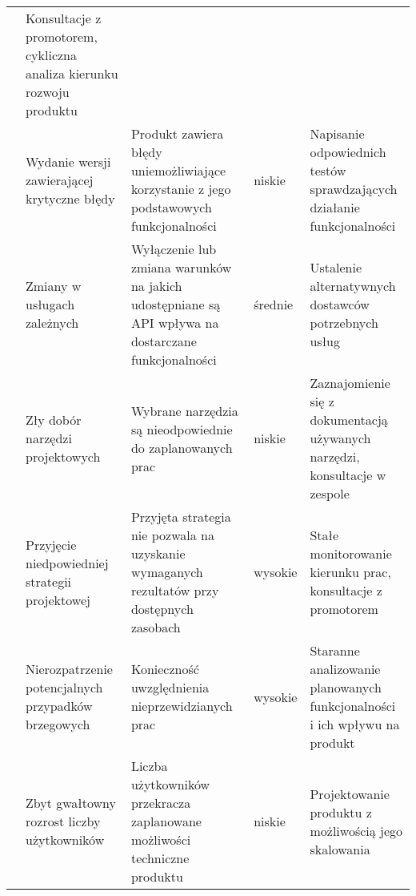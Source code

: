 \begin{longtable}{|p{.1\linewidth}|p{}|p{}|p{}|p{}|}
     & Konsultacje z promotorem, cykliczna analiza kierunku rozwoju produktu \\
     \cline{2-5}
     & Wydanie wersji zawierającej krytyczne błędy & Produkt zawiera błędy uniemożliwiające korzystanie z jego podstawowych funkcjonalności & niskie
     & Napisanie odpowiednich testów sprawdzających działanie funkcjonalności \\
     \cline{2-5}
     & Zmiany w usługach zależnych & Wyłączenie lub zmiana warunków na jakich udostępniane są API wpływa na dostarczane funkcjonalności & średnie
     & Ustalenie alternatywnych dostawców potrzebnych usług \\
     \cline{2-5}
     & Zły dobór narzędzi projektowych & Wybrane narzędzia są nieodpowiednie do zaplanowanych prac & niskie
     & Zaznajomienie się z dokumentacją używanych narzędzi, konsultacje w zespole \\
    \hline
    \multirow{2}{=}{\parbox[c]{3.5cm}{}} & Przyjęcie niedpowiedniej strategii projektowej & Przyjęta strategia nie pozwala na uzyskanie wymaganych rezultatów przy dostępnych zasobach & wysokie
     & Stałe monitorowanie kierunku prac, konsultacje z promotorem \\
     \cline{2-5}
     & Nierozpatrzenie potencjalnych przypadków brzegowych & Konieczność uwzględnienia nieprzewidzianych prac & wysokie
     & Staranne analizowanie planowanych funkcjonalności i ich wpływu na produkt \\
     \hline
     \multirow{1}{=}{\parbox[c]{2cm}{}}& Zbyt gwałtowny rozrost liczby użytkowników & Liczba użytkowników przekracza zaplanowane możliwości techniczne produktu & niskie
     & Projektowanie produktu z możliwością jego skalowania \\
    \hline

\end{longtable}



